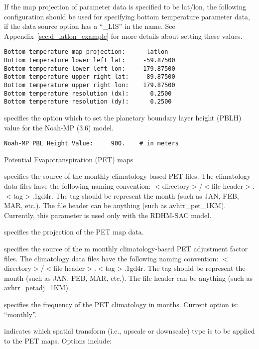  
 If the map projection of parameter data is specified to be lat/lon, 
 the following configuration should be used for specifying bottom
 temperature parameter data, if the data source option has a 
 ``\_LIS'' in the name.
 See Appendix~\ref{sec:d_latlon_example} for more details about
 setting these values.
 

 \begin{Verbatim}[frame=single]
Bottom temperature map projection:      latlon 
Bottom temperature lower left lat:     -59.87500
Bottom temperature lower left lon:    -179.87500
Bottom temperature upper right lat:     89.87500
Bottom temperature upper right lon:    179.87500
Bottom temperature resolution (dx):      0.2500
Bottom temperature resolution (dy):      0.2500
 \end{Verbatim}

 
  specifies the
 option which to set the planetary boundary layer
 height (PBLH) value for the Noah-MP (3.6) model.

 

 \begin{Verbatim}[frame=single]
Noah-MP PBL Height Value:     900.    # in meters
 \end{Verbatim}


 
 Potential Evapotranspiration (PET) maps

  specifies the source of the monthly climatology based
 PET files. The climatology data files have the following
 naming convention: $<$directory$>$/$<$file header$>$.$<$tag$>$.1gd4r.
 The tag should be represent the month (such as JAN, FEB, MAR, etc.).
 The file header can be anything (such as avhrr\_pet\_1KM).
 Currently, this parameter is used only with the RDHM-SAC model.

  specifies the projection of the
 PET map data.

  specifies the source of the m
 monthly climatology-based PET adjustment factor files.
 The climatology data files have the following
 naming convention: $<$directory$>$/$<$file header$>$.$<$tag$>$.1gd4r.
 The tag should be represent the month (such as JAN, FEB, MAR, etc.).
 The file header can be anything (such as avhrr\_petadj\_1KM).

  specifies the frequency of the
  PET climatology in months. Current option is:  ``monthly''.

  indicates which spatial transform
 (i.e., upscale or downscale) type is to be applied to the PET 
 maps.  Options include:


